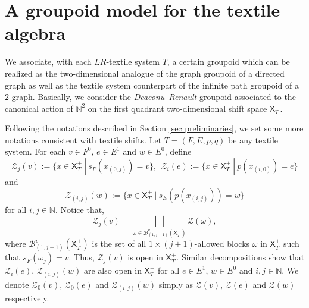\documentclass[a4paper,reqno,12pt]{amsart}
\newcommand{\Zz}{\mathcal{Z}}
\newcommand{\Xs}{\mathsf{X}}
\theoremstyle{definition}
\theoremstyle{remark}
\begin{document}
\section{A groupoid model for the textile algebra}\label{sec groupoid of TS}
We associate, with each $LR$-textile system $T$, a certain groupoid which can be realized as the two-dimensional analogue of the graph groupoid of a directed graph as well as the textile system counterpart of the infinite path groupoid of a $2$-graph. Basically, we consider the \emph{Deaconu--Renault} groupoid associated to the canonical action of $\mathbb{N}^2$ on the first quadrant two-dimensional shift space $\mathsf{X}_T^+$. 

Following the notations described in Section \ref{sec preliminaries}, we set some more notations consistent with textile shifts. Let $T=(F,E,p,q)$ be any textile system. For each $v\in F^0$, $e\in E^1$ and $w\in E^0$, define \[\Zz_j(v):=\{x\in \mathsf{X}_T^+~|~s_F(x_{(0,j)})=v\},~~\Zz_i(e):=\{x\in \mathsf{X}_T^+~|~p(x_{(i,0)})=e\}\] and \[\Zz_{(i,j)}(w):=\{x\in \Xs_T^+~|~s_E(p(x_{(i,j)}))=w\}\] for all $i,j\in \mathbb{N}$. Notice that, \[\Zz_j(v)=\displaystyle{\bigsqcup_{\omega\in \mathcal{B}_{(1,j+1)}^v(\Xs_T^+)}} \Zz(\omega),\] where $\mathcal{B}_{(1,j+1)}^v(\Xs_T^+)$ is the set of all $1\times (j+1)$-allowed blocks $\omega$ in $\Xs_T^+$ such that $s_F(\omega_j)=v$. Thus, $\Zz_j(v)$ is open in $\Xs_T^+$. Similar decompositions show that $\Zz_i(e)$, $\Zz_{(i,j)}(w)$ are also open in $\Xs_T^+$ for all $e\in E^1$, $w\in E^0$ and $i,j\in \mathbb{N}$. We denote $\Zz_0(v)$, $\Zz_0(e)$ and $\Zz_{(i,j)}(w)$ simply as $\Zz(v)$, $\Zz(e)$ and $\Zz(w)$ respectively. 
\end{document}
